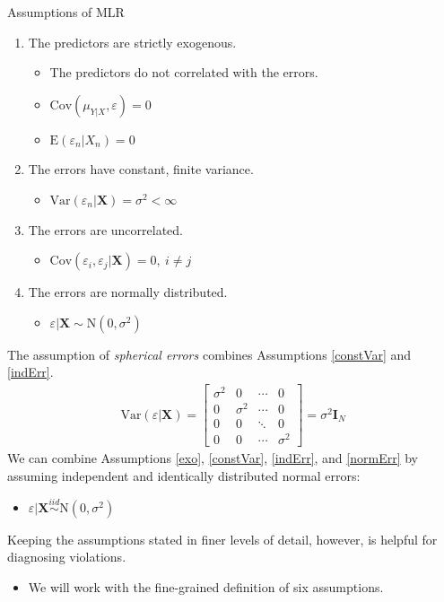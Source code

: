 \documentclass{beamer}\usepackage[]{graphicx}\usepackage[]{color}
\begin{document}
\begin{frame}[allowframebreaks]{Assumptions of MLR}
\begin{enumerate}
  \item The predictors are strictly exogenous.\label{exo}
    \vc
    \begin{itemize}
    \item The predictors do not correlated with the errors.
      \vc
    \item $\text{Cov}(\mu_{Y|X}, \varepsilon) = 0$
      \vc
    \item $\text{E}(\varepsilon_n|X_n) = 0$
    \end{itemize}
    \vb    
  \item The errors have constant, finite variance.\label{constVar}
    \vc
    \begin{itemize}
    \item $\text{Var}(\varepsilon_n|\mathbf{X}) = \sigma^2 < \infty$
    \end{itemize}
    \vb
  \item The errors are uncorrelated.\label{indErr}
    \vc
    \begin{itemize}
    \item $\text{Cov}(\varepsilon_i, \varepsilon_j|\mathbf{X}) = 0, ~ i \neq j$
    \end{itemize}
    \vb
  \item The errors are normally distributed.\label{normErr}
    \vc
    \begin{itemize}
    \item $\varepsilon|\mathbf{X} \sim \text{N}(0, \sigma^2)$
    \end{itemize}
  \end{enumerate}
  
  \pagebreak
  
  The assumption of \emph{spherical errors} combines Assumptions \ref{constVar} 
  and \ref{indErr}. 
  \begin{align*}
    \text{Var}(\varepsilon|\mathbf{X}) = 
    \begin{bmatrix}
      \sigma^2 & 0 & \cdots & 0\\
      0 & \sigma^2 & \cdots & 0\\
      0 & 0 & \ddots & 0\\
      0 & 0 & \cdots & \sigma^2 
    \end{bmatrix} = 
    \sigma^2\mathbf{I}_N
  \end{align*}
  We can combine Assumptions \ref{exo}, \ref{constVar}, \ref{indErr}, and 
  \ref{normErr} by assuming independent and identically distributed normal 
  errors:
  \begin{itemize}
  \item $\varepsilon|\mathbf{X} \overset{iid}{\sim} \text{N}(0, \sigma^2)$
  \end{itemize}
  \vb
  Keeping the assumptions stated in finer levels of detail, however, is helpful 
  for diagnosing violations.
  \begin{itemize}
  \item We will work with the fine-grained definition of six assumptions.
  \end{itemize}
  
\end{frame}
\end{document}
